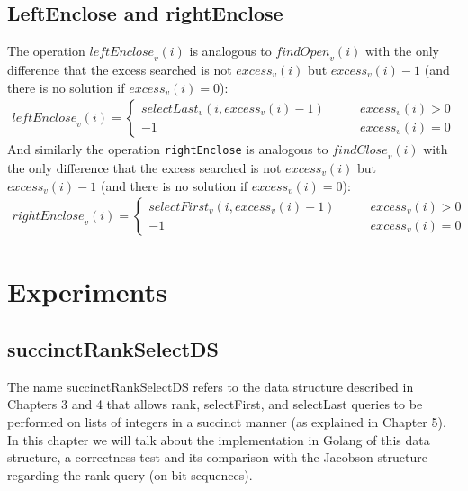 \documentclass{article}
\begin{document}
\subsection{LeftEnclose and rightEnclose}
The operation $\mathit{leftEnclose}_v(i)$ is analogous to $\mathit{findOpen}_v(i)$ with the only difference that the excess searched is not $\mathit{excess}_v(i)$ but $\mathit{excess}_v(i)-1$ (and there is no solution if $\mathit{excess}_v(i)=0$):
    \begin{align*}
        \mathit{leftEnclose}_v(i) =
        \begin{cases}
            \mathit{selectLast}_v(i,\mathit{excess}_v(i)-1) \qquad &\mathit{excess}_v(i)>0 \\
            -1 \qquad &\mathit{excess}_v(i)=0
        \end{cases}
    \end{align*}
And similarly the operation \texttt{rightEnclose} is analogous to $\mathit{findClose}_v(i)$ with the only difference that the excess searched is not $\mathit{excess}_v(i)$ but $\mathit{excess}_v(i)-1$ (and there is no solution if $\mathit{excess}_v(i)=0$): 
    \begin{align*}
        \mathit{rightEnclose}_v(i) =
        \begin{cases}
            \mathit{selectFirst}_v(i,\mathit{excess}_v(i)-1) \qquad &\mathit{excess}_v(i)>0 \\
            -1 \qquad &\mathit{excess}_v(i)=0
        \end{cases}
    \end{align*}
    
\section{Experiments}

\subsection{succinctRankSelectDS}
The name succinctRankSelectDS refers to the data structure described in Chapters 3 and 4 that allows rank, selectFirst, and selectLast queries to be performed on lists of integers in a succinct manner (as explained in Chapter 5). In this chapter we will talk about the implementation in Golang of this data structure, a correctness test and its comparison with the Jacobson structure regarding the rank query (on bit sequences).
\end{document}
